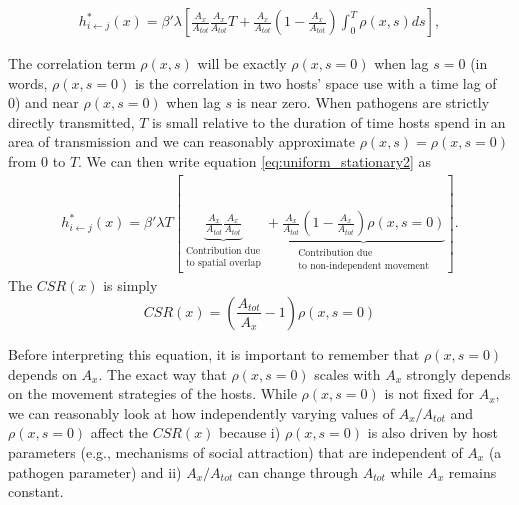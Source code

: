 \documentclass[letterpaper]{article}
\begin{document}
\begin{equation}
    \begin{aligned}
        h^*_{i \leftarrow j}(x) = \beta' \lambda \left[\frac{A_x}{A_{tot}}\frac{A_x}{A_{tot}} T + \frac{A_x}{A_{tot}}(1 - \frac{A_x}{A_{tot}}) \int_{0}^{T} \rho(x, s) ds\right],
    \end{aligned}
    \label{eq:uniform_stationary2}
\end{equation}

The correlation term $\rho(x, s)$ will be exactly $\rho(x, s = 0)$ when lag $s = 0$ (in words, $\rho(x, s = 0)$ is the correlation in two hosts' space use with a time lag of 0) and near $\rho(x, s = 0)$ when lag $s$ is near zero.  When pathogens are strictly directly transmitted, $T$ is small relative to the duration of time hosts spend in an area of transmission and we can reasonably approximate $\rho(x, s) = \rho(x, s = 0)$ from 0 to $T$.  We can then write equation \ref{eq:uniform_stationary2} as 
\begin{equation}
    \begin{aligned}
        h^*_{i \leftarrow j}(x) = \beta' \lambda T \left[\underbrace{\frac{A_x}{A_{tot}}\frac{A_x}{A_{tot}}}_{\substack{\text{Contribution due} \\  \text{to spatial overlap}}} + \underbrace{\frac{A_x}{A_{tot}}(1 - \frac{A_x}{A_{tot}}) \rho(x, s=0)}_{\substack{\text{Contribution due} \\ \text{to non-independent movement}}} \right].
    \end{aligned}
    \label{eq:uniform_direct}
\end{equation}
The $CSR(x)$ is simply 
\begin{equation}
    CSR(x) = (\frac{A_{tot}}{A_{x}} - 1)\rho(x, s=0)
    \label{eq:analytical_relationship}
\end{equation}

Before interpreting this equation, it is important to remember that $\rho(x, s=0)$ depends on $A_x$. The exact way that $\rho(x, s=0)$ scales with $A_x$ strongly depends on the movement strategies of the hosts.  While $\rho(x, s=0)$ is not fixed for $A_x$, we can reasonably look at how independently varying values of $A_x / A_{tot}$ and $\rho(x, s=0)$ affect the $CSR(x)$ because i) $\rho(x, s=0)$ is also driven by host parameters (e.g., mechanisms of social attraction) that are independent of $A_x$ (a pathogen parameter) and ii) $A_x / A_{tot}$ can change through $A_{tot}$ while $A_{x}$ remains constant.
\end{document}
